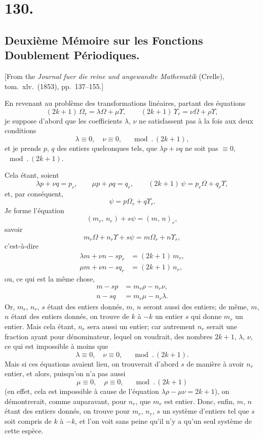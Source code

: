 \documentclass[11pt,a4paper]{book}
\begin{document}
\section*{130.}
\subsection*{Deuxi\`eme M\'emoire sur les Fonctions Doublement P\'eriodiques.}

[From the \textit{Journal fuer die reine und angewandte Mathematik} (Crelle),
tom.\ xlv.\ (1853), pp.\ 137--155.]

\medskip

En revenant au probl\`eme des transformations lin\'eaires, partant des \'equations
\[
(2k+1)\,\Omega_r = \lambda\Omega + \mu\Upsilon,
\qquad
(2k+1)\,\Upsilon_r = \nu\Omega + \rho\Upsilon,
\]
je suppose d'abord que les coefficients $\lambda$, $\nu$ ne satisfassent pas
\`a la fois aux deux conditions
\[
\lambda \equiv 0,\quad \nu \equiv 0, \quad \mod.\,(2k+1),
\]
et je prends $p$, $q$ des entiers quelconques tels, que $\lambda p + \nu q$
ne soit pas $\equiv 0$, $\mod.\,(2k+1)$.

Cela \'etant, soient
\[
\lambda p + \nu q = p_r, \qquad
\mu p + \rho q = q_r, \qquad
(2k+1)\,\psi = p_r\Omega + q_r\Upsilon,
\]
et, par cons\'equent,
\[
\psi = p\Omega_r + q\Upsilon_r.
\]
Je forme l'\'equation
\[
(m_r,\, n_r) + s\psi = (m,\, n)_r,
\]
savoir
\[
m_r\Omega + n_r\Upsilon + s\psi = m\Omega_r + n\Upsilon_r,
\]
c'est-\`a-dire
\begin{align*}
\lambda m + \nu n - sp_r &= (2k+1)\,m_r, \\
\mu m + \nu n - sq_r &= (2k+1)\,n_r,
\end{align*}
ou, ce qui est la m\^eme chose,
\begin{align*}
m - sp &= m_r\rho - n_r\nu, \\
n - sq &= m_r\mu - n_r\lambda.
\end{align*}
Or, $m_r$, $n_r$, $s$ \'etant des entiers donn\'es, $m$, $n$ seront aussi des
entiers; de m\^eme, $m$, $n$ \'etant des entiers donn\'es, on trouve de $k$ \`a
$-k$ un entier $s$ qui donne $m_r$ un entier. Mais cela \'etant, $n_r$ sera
aussi un entier; car autrement $n_r$ serait une fraction ayant pour
d\'enominateur, lequel on voudrait, des nombres $2k+1$, $\lambda$, $\nu$, ce qui
est impossible \`a moins que
\[
\lambda \equiv 0,\quad \nu \equiv 0, \quad \mod.\,(2k+1).
\]
Mais si ces \'equations avaient lieu, on trouverait d'abord $s$ de mani\`ere
\`a avoir $n_r$ entier, et alors, puisqu'on n'a pas aussi
\[
\mu \equiv 0,\quad \rho \equiv 0, \quad \mod.\,(2k+1)
\]
(en effet, cela est impossible \`a cause de l'\'equation
$\lambda\rho - \mu\nu = 2k+1$), on d\'emontrerait, comme auparavant, pour
$n_r$, que $m_r$ est entier. Donc, enfin, $m$, $n$ \'etant des entiers donn\'es,
on trouve pour $m_r$, $n_r$, $s$ un syst\`eme d'entiers tel que $s$ soit
compris de $k$ \`a $-k$, et l'on voit sans peine qu'il n'y a qu'un seul
syst\`eme de cette esp\`ece.
\end{document}
